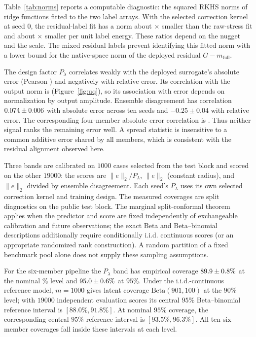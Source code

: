 Table~\ref{tab:norms} reports a computable diagnostic: the squared RKHS norms
of ridge functions fitted to the two label arrays. With the selected
correction kernel at seed $0$, the residual-label fit has a norm about
\normRatio$\times$ smaller than the raw-stress fit and about
\normRatioNorm$\times$ smaller per unit label energy. These ratios depend on
the nugget and the scale. The mixed residual labels prevent identifying this
fitted norm with a lower bound for the native-space norm of the deployed
residual $G-m_{\mathrm{full}}$.

The design factor $P_\lambda$ correlates weakly with the deployed surrogate's
absolute error (Pearson \uqCorrAbs) and negatively with relative error. Its
correlation with the output norm is \uqCorrNorm{} (Figure~\ref{fig:uq}), so
its association with error depends on normalization by output amplitude.
Ensemble disagreement has correlation
$0.074\pm0.006$ with absolute error across ten seeds and
$-0.25\pm0.04$ with relative error. The corresponding four-member absolute
error correlation is \uqDisAbsFour. Thus neither signal ranks the
remaining error well. A spread statistic is insensitive to a common additive
error shared by all members, which is consistent with the residual alignment
observed here.

Three bands are calibrated on $1000$ cases selected from the test block and
scored on the other $19000$: the scores are $\|e\|_2/P_\lambda$, $\|e\|_2$
(constant radius), and $\|e\|_2$ divided by ensemble disagreement. Each seed's
$P_\lambda$ uses its own selected correction kernel and training design.
The measured coverages are split diagnostics on the public test block. The marginal split-conformal theorem applies when the
predictor and score are fixed independently of exchangeable calibration and
future observations; the exact Beta and Beta--binomial descriptions additionally
require conditionally i.i.d. continuous scores (or an appropriate randomized
rank construction). A random partition of a fixed benchmark pool alone does not supply these
sampling assumptions.

For the six-member pipeline the $P_\lambda$ band has empirical coverage
$89.9\pm0.8\%$ at the nominal \uqCoverNom\% level and
$95.0\pm0.6\%$ at $95\%$. Under the i.i.d.-continuous
reference model, $m=1000$ gives latent coverage
$\mathrm{Beta}(901,100)$ at the $90\%$ level; with $19000$ independent
evaluation scores its central $95\%$ Beta--binomial reference interval is
$[88.0\%,91.8\%]$. At nominal $95\%$ coverage, the corresponding central
$95\%$ reference interval is $[93.5\%,96.3\%]$.
All ten six-member coverages fall inside these intervals at each
level.

